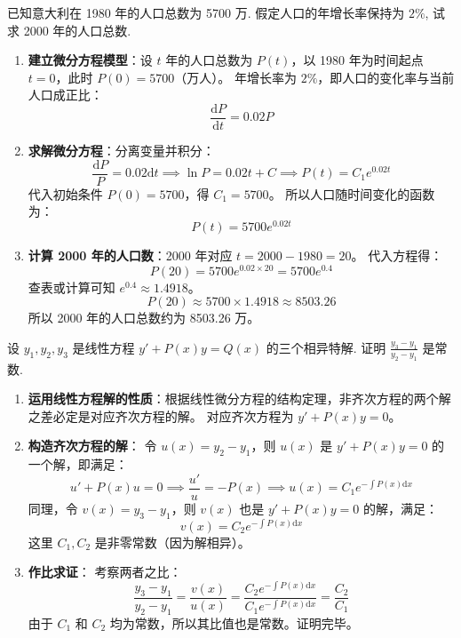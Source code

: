 \documentclass[lang=cn,11pt]{elegantbook}
\begin{document}
\begin{exercise}[人口增长模型]
已知意大利在 1980 年的人口总数为 5700 万. 假定人口的年增长率保持为 $2\%$, 试求 2000 年的人口总数.
\end{exercise}
\begin{solution}
\begin{enumerate}
    \item \textbf{建立微分方程模型}：设 $t$ 年的人口总数为 $P(t)$，以 1980 年为时间起点 $t=0$，此时 $P(0) = 5700$（万人）。
    年增长率为 $2\%$，即人口的变化率与当前人口成正比：
    \[
    \frac{\mathrm{d}P}{\mathrm{d}t} = 0.02 P
    \]
    
    \item \textbf{求解微分方程}：分离变量并积分：
    \[
    \frac{\mathrm{d}P}{P} = 0.02 \mathrm{d}t \implies \ln P = 0.02 t + C \implies P(t) = C_1 e^{0.02 t}
    \]
    代入初始条件 $P(0) = 5700$，得 $C_1 = 5700$。
    所以人口随时间变化的函数为：
    \[
    P(t) = 5700 e^{0.02 t}
    \]
    
    \item \textbf{计算 2000 年的人口数}：2000 年对应 $t = 2000 - 1980 = 20$。
    代入方程得：
    \[
    P(20) = 5700 e^{0.02 \times 20} = 5700 e^{0.4}
    \]
    查表或计算可知 $e^{0.4} \approx 1.4918$。
    \[
    P(20) \approx 5700 \times 1.4918 \approx 8503.26
    \]
    所以 2000 年的人口总数约为 8503.26 万。
\end{enumerate}
\end{solution}

\begin{exercise}[一阶线性微分方程解的结构]
设 $y_1, y_2, y_3$ 是线性方程 $y'+P(x)y=Q(x)$ 的三个相异特解. 证明 $\frac{y_3-y_1}{y_2-y_1}$ 是常数.
\end{exercise}
\begin{solution}
\begin{enumerate}
    \item \textbf{运用线性方程解的性质}：根据线性微分方程的结构定理，非齐次方程的两个解之差必定是对应齐次方程的解。
    对应齐次方程为 $y' + P(x)y = 0$。
    
    \item \textbf{构造齐次方程的解}：
    令 $u(x) = y_2 - y_1$，则 $u(x)$ 是 $y' + P(x)y = 0$ 的一个解，即满足：
    \[
    u' + P(x)u = 0 \implies \frac{u'}{u} = -P(x) \implies u(x) = C_1 e^{-\int P(x)\mathrm{d}x}
    \]
    同理，令 $v(x) = y_3 - y_1$，则 $v(x)$ 也是 $y' + P(x)y = 0$ 的解，满足：
    \[
    v(x) = C_2 e^{-\int P(x)\mathrm{d}x}
    \]
    这里 $C_1, C_2$ 是非零常数（因为解相异）。
    
    \item \textbf{作比求证}：
    考察两者之比：
    \[
    \frac{y_3 - y_1}{y_2 - y_1} = \frac{v(x)}{u(x)} = \frac{C_2 e^{-\int P(x)\mathrm{d}x}}{C_1 e^{-\int P(x)\mathrm{d}x}} = \frac{C_2}{C_1}
    \]
    由于 $C_1$ 和 $C_2$ 均为常数，所以其比值也是常数。证明完毕。
\end{enumerate}
\end{solution}
\end{document}
